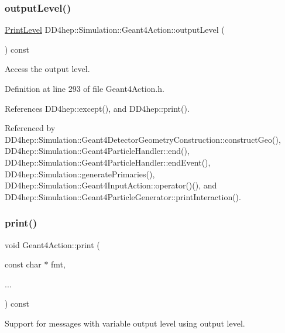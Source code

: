 \subsubsection{\texorpdfstring{output\+Level()}{outputLevel()}}
{\footnotesize\ttfamily \hyperlink{namespace_d_d4hep_a5b5a64d56252469451f2020a27d57d42}{Print\+Level} D\+D4hep\+::\+Simulation\+::\+Geant4\+Action\+::output\+Level (\begin{DoxyParamCaption}{ }\end{DoxyParamCaption}) const\hspace{0.3cm}{\ttfamily [inline]}}



Access the output level. 



Definition at line 293 of file Geant4\+Action.\+h.



References D\+D4hep\+::except(), and D\+D4hep\+::print().



Referenced by D\+D4hep\+::\+Simulation\+::\+Geant4\+Detector\+Geometry\+Construction\+::construct\+Geo(), D\+D4hep\+::\+Simulation\+::\+Geant4\+Particle\+Handler\+::end(), D\+D4hep\+::\+Simulation\+::\+Geant4\+Particle\+Handler\+::end\+Event(), D\+D4hep\+::\+Simulation\+::generate\+Primaries(), D\+D4hep\+::\+Simulation\+::\+Geant4\+Input\+Action\+::operator()(), and D\+D4hep\+::\+Simulation\+::\+Geant4\+Particle\+Generator\+::print\+Interaction().

\hypertarget{class_d_d4hep_1_1_simulation_1_1_geant4_action_a623119a9f20ff7f5a2fb78f4f76b9276}{}\label{class_d_d4hep_1_1_simulation_1_1_geant4_action_a623119a9f20ff7f5a2fb78f4f76b9276} 
\subsubsection{\texorpdfstring{print()}{print()}}
{\footnotesize\ttfamily void Geant4\+Action\+::print (\begin{DoxyParamCaption}\item[{const char $\ast$}]{fmt,  }\item[{}]{... }\end{DoxyParamCaption}) const}



Support for messages with variable output level using output level. 



